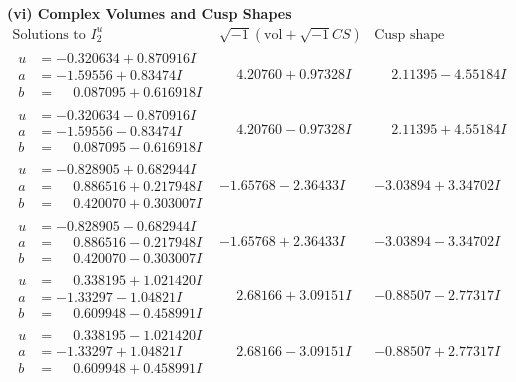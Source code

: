 \documentclass[1p]{elsarticle_modified}
\theoremstyle{definition}
\newcommand{\I}{\sqrt{-1}}
\begin{document}
\newpage\flushleft \textbf{(vi) Complex Volumes and Cusp Shapes}
$$\begin{array}{c|c|c}  
\text{Solutions to }I^u_{2}& \I (\text{vol} + \sqrt{-1}CS) & \text{Cusp shape}\\
 \hline 
\begin{aligned}
u &= -0.320634 + 0.870916 I \\
a &= -1.59556 + 0.83474 I \\
b &= \phantom{-}0.087095 + 0.616918 I\end{aligned}
 & \phantom{-}4.20760 + 0.97328 I & \phantom{-}2.11395 - 4.55184 I \\ \hline\begin{aligned}
u &= -0.320634 - 0.870916 I \\
a &= -1.59556 - 0.83474 I \\
b &= \phantom{-}0.087095 - 0.616918 I\end{aligned}
 & \phantom{-}4.20760 - 0.97328 I & \phantom{-}2.11395 + 4.55184 I \\ \hline\begin{aligned}
u &= -0.828905 + 0.682944 I \\
a &= \phantom{-}0.886516 + 0.217948 I \\
b &= \phantom{-}0.420070 + 0.303007 I\end{aligned}
 & -1.65768 - 2.36433 I & -3.03894 + 3.34702 I \\ \hline\begin{aligned}
u &= -0.828905 - 0.682944 I \\
a &= \phantom{-}0.886516 - 0.217948 I \\
b &= \phantom{-}0.420070 - 0.303007 I\end{aligned}
 & -1.65768 + 2.36433 I & -3.03894 - 3.34702 I \\ \hline\begin{aligned}
u &= \phantom{-}0.338195 + 1.021420 I \\
a &= -1.33297 - 1.04821 I \\
b &= \phantom{-}0.609948 - 0.458991 I\end{aligned}
 & \phantom{-}2.68166 + 3.09151 I & -0.88507 - 2.77317 I \\ \hline\begin{aligned}
u &= \phantom{-}0.338195 - 1.021420 I \\
a &= -1.33297 + 1.04821 I \\
b &= \phantom{-}0.609948 + 0.458991 I\end{aligned}
 & \phantom{-}2.68166 - 3.09151 I & -0.88507 + 2.77317 I \\ \hline\begin{aligned}

\end{aligned}
\end{array}$$
\end{document}
